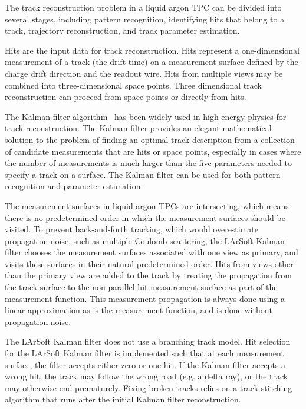 
The track reconstruction problem in a liquid argon TPC can be divided
into several stages, including pattern recognition, identifying hits
that belong to a track, trajectory reconstruction, and track parameter
estimation.

Hits are the input data for track reconstruction.  Hits represent a
one-dimensional measurement of a track (the drift time) on a
measurement surface defined by the charge drift direction and the
readout wire. Hits from multiple views may be combined into
three-dimensional space points. Three dimensional track reconstruction
can proceed from space points or directly from hits.

The Kalman filter algorithm~\cite{kalman} has been widely used in high
energy physics for track reconstruction. The Kalman filter provides an
elegant mathematical solution to the problem of finding an optimal
track description from a collection of candidate measurements that are
hits or space points, especially in cases where the number of
measurements is much larger than the five parameters needed to specify
a track on a surface.  The Kalman filter can be used for both pattern
recognition and parameter estimation.

The measurement surfaces in liquid argon TPCs are intersecting, which
means there is no predetermined order in which the measurement
surfaces should be visited.  To prevent back-and-forth tracking, which
would overestimate propagation noise, such as multiple Coulomb
scattering, the LArSoft Kalman filter chooses the measurement
surfaces associated with one view as primary, and visits these
surfaces in their natural predetermined order.  Hits from views other
than the primary view are added to the track by treating the
propagation from the track surface to the non-parallel hit measurement
surface as part of the measurement function.  This measurement
propagation is always done using a linear approximation as is the
measurement function, and is done without propagation noise.

The LArSoft Kalman filter does not use a branching track model. Hit
selection for the LArSoft Kalman filter is implemented such that at
each measurement surface, the filter accepts either zero or one
hit. If the Kalman filter accepts a wrong hit, the track may follow
the wrong road (e.g. a delta ray), or the track may otherwise end
prematurely.  Fixing broken tracks relies on a track-stitching
algorithm that runs after the initial Kalman filter reconstruction.

